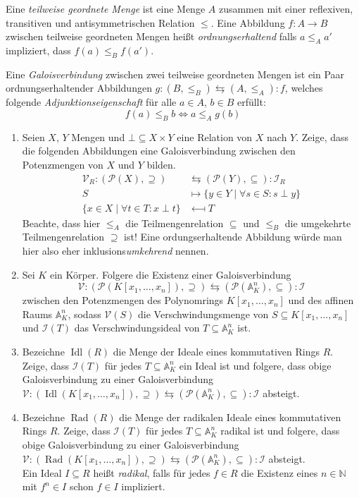 \documentclass{uebungsblatt}
\DeclareMathOperator{\Idl}{Idl}
\DeclareMathOperator{\Rad}{Rad}
\begin{document}

Eine \emph{teilweise geordnete Menge} ist eine Menge $A$ zusammen mit einer reflexiven, transitiven und antisymmetrischen Relation $≤$.
Eine Abbildung $f:A → B$ zwischen teilweise geordneten Mengen heißt \emph{ordnungserhaltend} falls $a ≤_A a'$ impliziert, dass $f(a) ≤_B f(a')$.

\begin{exercise}[Galoisverbindungen]
  Eine \emph{Galoisverbindung} zwischen zwei teilweise geordneten Mengen ist ein Paar ordnungserhaltender Abbildungen $g:(B,≤_B) ⇆ (A,≤_A):f$, welches folgende \emph{Adjunktionseigenschaft} für alle $a ∈ A$, $b ∈ B$ erfüllt:
  $$
  f(a) ≤_B b ⇔ a ≤_A g(b)
  $$
  \begin{enumerate}
    \item Seien $X$, $Y$ Mengen und $⊥ ⊆ X × Y$ eine Relation von $X$ nach $Y$.
      Zeige, dass die folgenden Abbildungen eine Galoisverbindung zwischen den Potenzmengen von $X$ und $Y$ bilden.
      \begin{align*}
        𝒱_R : (𝒫(X),⊇) &\leftrightarrows (𝒫(Y),⊆) : ℐ_R\\
        S & \longmapsto \{y ∈ Y \mid ∀s ∈ S:s \perp y\}\\
        \{x ∈ X \mid ∀t ∈ T:x \perp t\} & \longmapsfrom T
      \end{align*}
      {\scriptsize Beachte, dass hier $≤_A$ die Teilmengenrelation $⊆$ und $≤_B$ die umgekehrte Teilmengenrelation $⊇$ ist!
      Eine ordungserhaltende Abbildung würde man hier also eher inklusions\emph{umkehrend} nennen.}
    \item Sei $K$ ein Körper.
      Folgere die Existenz einer Galoisverbindung
      $$
      𝒱:(𝒫(K[x_1,\dots,x_n]),⊇) ⇆ (𝒫(𝔸^n_K),⊆):ℐ
      $$
      zwischen den Potenzmengen des Polynomrings $K[x_1,\dots,x_n]$ und des affinen Raums $𝔸^n_K$, sodass $𝒱(S)$ die Verschwindungsmenge von $S⊆K[x_1,\dots,x_n]$ und $ℐ(T)$ das Verschwindungsideal von $T⊆𝔸^n_K$ ist.
    \item Bezeichne $\Idl(R)$ die Menge der Ideale eines kommutativen Rings $R$.
      Zeige, dass $ℐ(T)$ für jedes $T⊆𝔸^n_K$ ein Ideal ist und folgere, dass obige Galoisverbindung zu einer Galoisverbindung $𝒱:(\Idl(K[x_1,\dots,x_n]),⊇) ⇆ (𝒫(𝔸^n_K),⊆):ℐ$ absteigt.
    \item Bezeichne $\Rad(R)$ die Menge der radikalen Ideale eines kommutativen Rings $R$.
    Zeige, dass $ℐ(T)$ für jedes $T⊆𝔸^n_K$ radikal ist und folgere, dass obige Galoisverbindung zu einer Galoisverbindung $𝒱:(\Rad(K[x_1,\dots,x_n]),⊇) ⇆ (𝒫(𝔸^n_K),⊆):ℐ$ absteigt.\\
      {\scriptsize Ein Ideal $I⊆R$ heißt \emph{radikal}, falls für jedes $f ∈ R$ die Existenz eines $n ∈ ℕ$ mit $f^n ∈ I$ schon $f ∈ I$ impliziert.}
  \end{enumerate}
\end{exercise}
\end{document}
